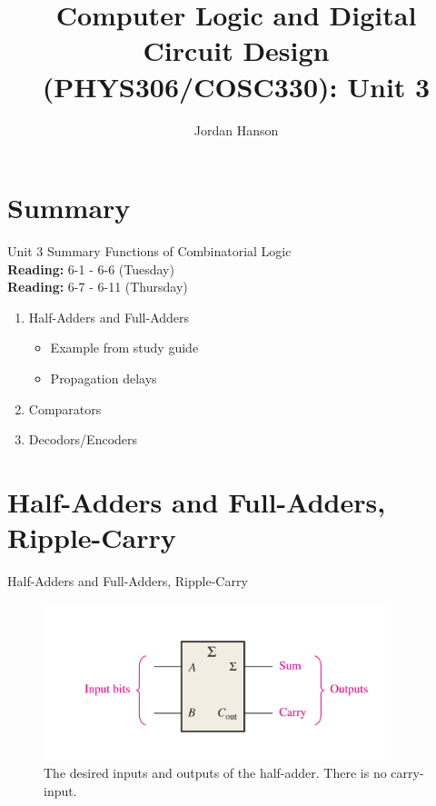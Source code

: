 \documentclass{beamer}
\title{Computer Logic and Digital Circuit Design (PHYS306/COSC330): Unit 3}
\author{Jordan Hanson}
\institute{Whittier College Department of Physics and Astronomy}
\begin{document}
\maketitle

\section{Summary}

\begin{frame}{Unit 3 Summary}
\alert{Functions of Combinatorial Logic} \\
\textbf{Reading:} 6-1 - 6-6 (Tuesday) \\
\textbf{Reading:} 6-7 - 6-11 (Thursday)
\begin{enumerate}
\item Half-Adders and Full-Adders
\begin{itemize}
\item Example from study guide
\item Propagation delays
\end{itemize}
\item Comparators
\item Decodors/Encoders
\end{enumerate}
\end{frame}

\section{Half-Adders and Full-Adders, Ripple-Carry}

\begin{frame}{Half-Adders and Full-Adders, Ripple-Carry}
\begin{figure}
\centering
\includegraphics[width=0.9\textwidth]{figures/adder1.pdf}
\caption{\label{fig:add1} The desired inputs and outputs of the half-adder.  There is no carry-input.}
\end{figure}
\end{frame}
\end{document}

